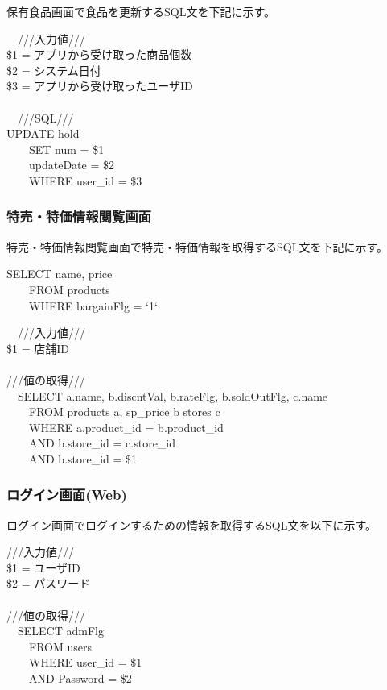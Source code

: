 \documentclass[a4j]{jarticle}
\begin{document}
保有食品画面で食品を更新するSQL文を下記に示す。
\begin{screen}
  　///入力値///\\
  \$1 = アプリから受け取った商品個数\\
  \$2 = システム日付\\
  \$3 = アプリから受け取ったユーザID\\
  \\
  　///SQL///\\
  UPDATE hold\\
  　　SET num = \$1\\
  　　updateDate = \$2\\
  　　WHERE user\_id = \$3
\end{screen}


\subsubsection{特売・特価情報閲覧画面}
特売・特価情報閲覧画面で特売・特価情報を取得するSQL文を下記に示す。
\begin{screen}
  SELECT name, price\\
  　　FROM products\\
  　　WHERE bargainFlg = `1`
\end{screen}

\begin{screen}
  　///入力値///\\
  \$1 = 店舗ID\\
  \\
  ///値の取得///\\
  　SELECT a.name, b.discntVal, b.rateFlg, b.soldOutFlg, c.name\\
  　　FROM products a, sp\_price b stores c\\
  　　WHERE a.product\_id = b.product\_id\\
  　　AND b.store\_id = c.store\_id\\
  　　AND b.store\_id = \$1
\end{screen}


\subsubsection{ログイン画面(Web)}
ログイン画面でログインするための情報を取得するSQL文を以下に示す。

\begin{screen}
  ///入力値///\\
  \$1 = ユーザID\\
  \$2 = パスワード\\
  \\
  ///値の取得///\\
  　SELECT admFlg\\
  　　FROM users\\
  　　WHERE user\_id = \$1\\
  　　AND Password = \$2
\end{screen}
\end{document}
